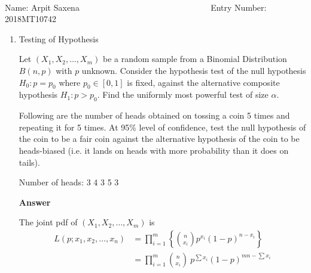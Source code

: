 \documentclass[12pt, oneside]{article}
\begin{document}
\setlength{\textheight}{8.5in}
\\





\vskip 0.5cm

\noindent Name: Arpit Saxena ~~~  ~~~~~ ~~~~ ~~~~~~~~~~~~~~~~ Entry Number: 2018MT10742 ~~~~~~~~~~~



\vskip 0.5cm



\begin{enumerate}
	



\item {
    Testing of Hypothesis

    Let \((X_1, X_2, \ldots, X_m)\) be a random sample from a Binomial Distribution
    \(B(n, p)\) with \(p\) unknown. Consider the hypothesis test of the null hypothesis
    \(H_0: p = p_0\) where \(p_0 \in [0, 1]\) is fixed, against the alternative
    composite hypothesis \(H_1: p > p_0\). Find the uniformly most powerful test of size
    \(\alpha\).

    Following are the number of heads obtained on tossing a coin 5 times and repeating
    it for 5 times. At 95\% level of confidence, test the null hypothesis of the coin
    to be a fair coin against the alternative hypothesis of the coin to be heads-biased 
    (i.e. it lands on heads with more probability than it does on tails).

    Number of heads: 3 4 3 5 3

    \textbf{Answer}

    The joint pdf of \((X_1, X_2, \ldots, X_m)\) is
    \begin{align*}
        L(p; x_1, x_2, \ldots, x_n) &= \prod_{i = 1}^{m} \left\{ {n \choose x_i} p^{x_i} (1 - p)^{n - x_i} \right\} \\
            &= \prod_{i=1}^{m} {n \choose x_i} ~ p^{\sum x_i} (1 - p)^{mn - \sum x_i}
    \end{align*}

}
\end{enumerate}
\end{document}
